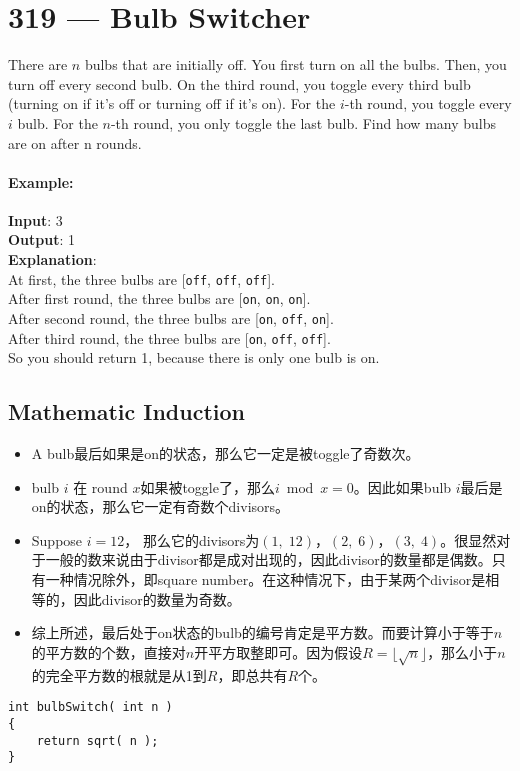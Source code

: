 \section{319 --- Bulb Switcher}
There are $ n $ bulbs that are initially off. You first turn on all the bulbs. Then, you turn off every second bulb. On the third round, you toggle every third bulb (turning on if it's off or turning off if it's on). For the $ i $-th round, you toggle every $ i $ bulb. For the $ n $-th round, you only toggle the last bulb. Find how many bulbs are on after n rounds.

\paragraph{Example:}

\begin{flushleft}
\textbf{Input}: 3
\\
\textbf{Output}: 1 
\\
\textbf{Explanation}: 
\\
At first, the three bulbs are [\texttt{off}, \texttt{off}, \texttt{off}].
\\
After first round, the three bulbs are [\texttt{on}, \texttt{on}, \texttt{on}].
\\
After second round, the three bulbs are [\texttt{on}, \texttt{off}, \texttt{on}].
\\
After third round, the three bulbs are [\texttt{on}, \texttt{off}, \texttt{off}]. 
\\
So you should return 1, because there is only one bulb is on.
\end{flushleft}
\subsection{Mathematic Induction}
\begin{itemize}
\item A bulb最后如果是on的状态，那么它一定是被toggle了奇数次。
\item bulb $ i $ 在 round $ x $如果被toggle了，那么$ i\bmod x = 0 $。因此如果bulb $ i $最后是on的状态，那么它一定有奇数个divisors。
\item Suppose $ i=12 $， 那么它的divisors为$ (1,\;12) $，$ (2,\;6) $，$ (3,\;4) $。很显然对于一般的数来说由于divisor都是成对出现的，因此divisor的数量都是偶数。只有一种情况除外，即square number。在这种情况下，由于某两个divisor是相等的，因此divisor的数量为奇数。
\item 综上所述，最后处于on状态的bulb的编号肯定是平方数。而要计算小于等于$ n $的平方数的个数，直接对$n$开平方取整即可。因为假设$R=\lfloor\sqrt{n}\rfloor$，那么小于$ n $的完全平方数的根就是从1到$ R $，即总共有$R$个。
\end{itemize}
\setcounter{lstlisting}{0}
\begin{lstlisting}[style=customc, caption={Count Of Square Numbers}]
int bulbSwitch( int n )
{
    return sqrt( n );
}
\end{lstlisting}